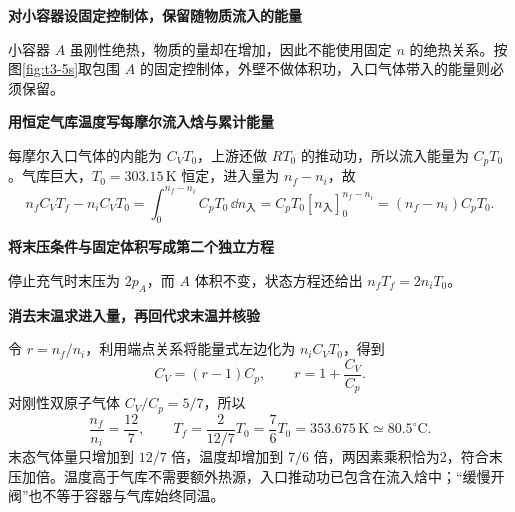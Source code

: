 \begin{solution}\textbf{对小容器设固定控制体，保留随物质流入的能量}\par\nobreak
小容器 $A$ 虽刚性绝热，物质的量却在增加，因此不能使用固定 $n$ 的绝热关系。按图\ref{fig:t3-5s}取包围 $A$ 的固定控制体，外壁不做体积功，入口气体带入的能量则必须保留。


\par\medskip{}\noindent\textbf{用恒定气库温度写每摩尔流入焓与累计能量}\par\nobreak
每摩尔入口气体的内能为 $C_VT_0$，上游还做 $RT_0$ 的推动功，所以流入能量为 $C_pT_0$。气库巨大，$T_0=303.15\,\mathrm K$ 恒定，进入量为 $n_f-n_i$，故
\[n_fC_VT_f-n_iC_VT_0
=\int_0^{n_f-n_i}C_pT_0\,\dd n_{\text{入}}
=C_pT_0[n_{\text{入}}]_0^{n_f-n_i}
=(n_f-n_i)C_pT_0.\]


\par\medskip{}\noindent\textbf{将末压条件与固定体积写成第二个独立方程}\par\nobreak
停止充气时末压为 $2p_A$，而 $A$ 体积不变，状态方程还给出 $n_fT_f=2n_iT_0$。



\par\medskip{}\noindent\textbf{消去末温求进入量，再回代求末温并核验}\par\nobreak
令 $r=n_f/n_i$，利用端点关系将能量式左边化为 $n_iC_VT_0$，得到
\[C_V=(r-1)C_p,\qquad r=1+\frac{C_V}{C_p}.\]
对刚性双原子气体 $C_V/C_p=5/7$，所以
\[\boxed{\frac{n_f}{n_i}=\frac{12}{7},\qquad T_f=\frac{2}{12/7}T_0=\frac76T_0
=353.675\,\mathrm K\simeq80.5^\circ\mathrm C}.\]
末态气体量只增加到 $12/7$ 倍，温度却增加到 $7/6$ 倍，两因素乘积恰为2，符合末压加倍。温度高于气库不需要额外热源，入口推动功已包含在流入焓中；“缓慢开阀”也不等于容器与气库始终同温。
\end{solution}
